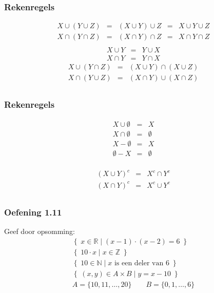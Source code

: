 \documentclass[dutch]{../khlslides}
\newcommand{\union}{\cup}
\newcommand{\intersect}{\cap}
\begin{document}
\begin{frame}
  \frametitle{Rekenregels}
  \[
    \begin{array}{rclclr}
      X \union (Y \union Z) & = & (X \union Y) \union Z & = & X \union Y \union Z \\
      X \intersect (Y \intersect Z) & = & (X \intersect Y) \intersect Z & = & X \intersect Y \intersect Z \\
    \end{array}
  \]
  \[
    \begin{array}{rcl}
      X \union Y & = & Y \union X \\
      X \intersect Y & = & Y \intersect X
    \end{array}
  \]
  \[
    \begin{array}{rcl}
      X \union (Y \intersect Z) & = & (X \union Y) \intersect (X \union Z) \\
      X \intersect (Y \union Z) & = & (X \intersect Y) \union (X \intersect Z) \\
    \end{array}
  \]
\end{frame}

\begin{frame}
  \frametitle{Rekenregels}
  \[
    \begin{array}{rclclr}
      X \union \emptyset & = & X \\
      X \intersect \emptyset & = & \emptyset \\
      X - \emptyset & = & X \\
      \emptyset - X & = & \emptyset \\
    \end{array}
  \]

  \[
    \begin{array}{rclclr}
      (X \union Y)^c & = & X^c \intersect Y^c \\
      (X \intersect Y)^c & = & X^c \union Y^c \\
    \end{array}
  \]
\end{frame}

\begin{frame}
  \frametitle{Oefening 1.11}
  Geef door opsomming:
  \[
    \begin{array}{c}
      \left\{ \; x \in \mathbb{R} \;|\; (x-1) \cdot (x-2) = 6 \; \right\} \\[1cm]
      \left\{ \; 10\cdot x \;|\; x \in \mathbb{Z} \; \right\} \\[1cm]
      \left\{ \; 10 \in \mathbb{N} \;|\; x \textrm{ is een deler van 6} \; \right\} \\[1cm]
      \left\{ \; (x, y) \in A \times B \;|\; y = x - 10 \; \right\} \\ A = \{10,11,\dots,20\} \qquad B = \{0,1,\dots,6\}
    \end{array}
  \]
\end{frame}
\end{document}
